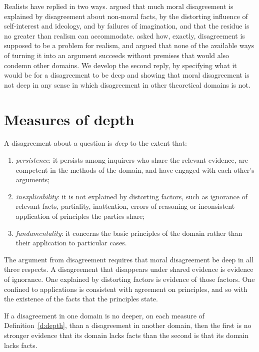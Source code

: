 \documentclass{situationist-preprint}
\begin{document}
Realists have replied in two ways. \citet{Brink1984} argued that much moral disagreement is explained by disagreement about non-moral facts, by the distorting influence of self-interest and ideology, and by failures of imagination, and that the residue is no greater than realism can accommodate. \citet{Enoch2009} asked how, exactly, disagreement is supposed to be a problem for realism, and argued that none of the available ways of turning it into an argument succeeds without premises that would also condemn other domains. We develop the second reply, by specifying what it would be for a disagreement to be deep and showing that moral disagreement is not deep in any sense in which disagreement in other theoretical domains is not.

\section{Measures of depth}

\begin{definition}[Depth]\label{d:depth}
A disagreement about a question is \emph{deep} to the extent that:
\begin{enumerate}[label=(\alph*)]
\item \emph{persistence}: it persists among inquirers who share the relevant evidence, are competent in the methods of the domain, and have engaged with each other's arguments;
\item \emph{inexplicability}: it is not explained by distorting factors, such as ignorance of relevant facts, partiality, inattention, errors of reasoning or inconsistent application of principles the parties share;
\item \emph{fundamentality}: it concerns the basic principles of the domain rather than their application to particular cases.
\end{enumerate}
\end{definition}

The argument from disagreement requires that moral disagreement be deep in all three respects. A disagreement that disappears under shared evidence is evidence of ignorance. One explained by distorting factors is evidence of those factors. One confined to applications is consistent with agreement on principles, and so with the existence of the facts that the principles state.

\begin{principle}[Parity]\label{p:parity}
If a disagreement in one domain is no deeper, on each measure of Definition~\ref{d:depth}, than a disagreement in another domain, then the first is no stronger evidence that its domain lacks facts than the second is that its domain lacks facts.
\end{principle}
\end{document}

